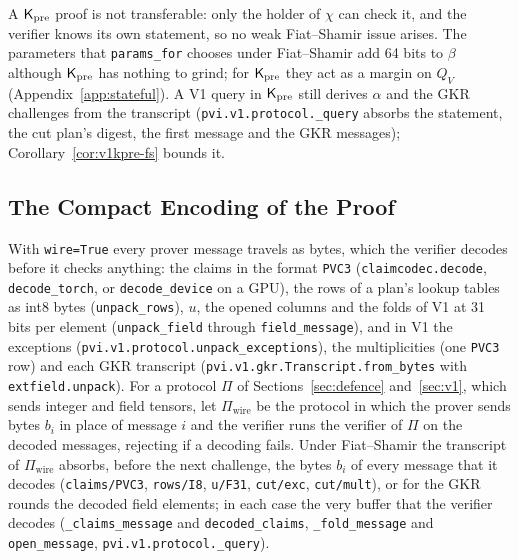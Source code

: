 \noindent A $\mathsf{K}_{\mathrm{pre}}$ proof is not transferable: only the holder of $\chi$ can check it, and the
verifier knows its own statement, so no weak Fiat--Shamir issue arises. The parameters that
\texttt{params\_for} chooses under Fiat--Shamir add 64 bits to $\beta$ although $\mathsf{K}_{\mathrm{pre}}$ has nothing
to grind; for $\mathsf{K}_{\mathrm{pre}}$ they act as a margin on $Q_V$ (Appendix~\ref{app:stateful}). A V1 query in
$\mathsf{K}_{\mathrm{pre}}$ still derives $\alpha$ and the GKR challenges from the transcript
(\texttt{pvi.v1.protocol.\_query} absorbs the statement, the cut plan's digest, the first message and
the GKR messages); Corollary~\ref{cor:v1kpre-fs} bounds it.

\subsection{The Compact Encoding of the Proof}
\label{app:codec}

 With \texttt{wire=True} every prover message travels as bytes, which the
verifier decodes before it checks anything: the claims in the format \texttt{PVC3}
(\texttt{claimcodec.decode}, \texttt{decode\_torch}, or \texttt{decode\_device} on a GPU), the rows
of a plan's lookup tables as int8 bytes (\texttt{unpack\_rows}), $u$, the opened columns and the
folds of V1 at 31 bits per element (\texttt{unpack\_field} through \texttt{field\_message}), and in
V1 the exceptions (\texttt{pvi.v1.protocol.unpack\_exceptions}), the multiplicities (one \texttt{PVC3}
row) and each GKR transcript (\texttt{pvi.v1.gkr.Transcript.from\_bytes} with
\texttt{extfield.unpack}). For a protocol $\Pi$ of Sections~\ref{sec:defence} and~\ref{sec:v1},
which sends integer and field tensors, let $\Pi_{\mathrm{wire}}$ be the protocol in which the prover
sends bytes $b_i$ in place of message $i$ and the verifier runs the verifier of $\Pi$ on the decoded
messages, rejecting if a decoding fails. Under Fiat--Shamir the transcript of
$\Pi_{\mathrm{wire}}$ absorbs, before the next challenge, the bytes $b_i$ of every message that it
decodes (\texttt{claims/PVC3}, \texttt{rows/I8}, \texttt{u/F31}, \texttt{cut/exc},
\texttt{cut/mult}), or for the GKR rounds the decoded field elements; in each case the very buffer
that the verifier decodes (\texttt{\_claims\_message} and \texttt{decoded\_claims},
\texttt{\_fold\_message} and \texttt{open\_message}, \texttt{pvi.v1.protocol.\_query}).

